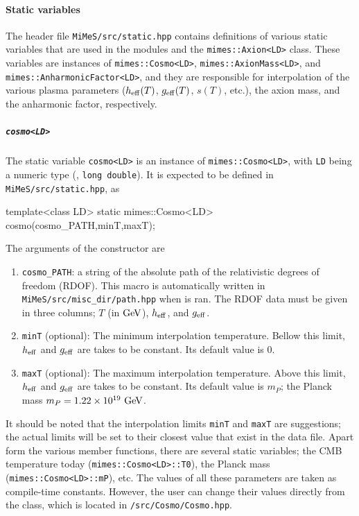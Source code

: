 \documentclass[11pt,a4paper]{article}
\begin{document}
\paragraph{Static variables} The header file {\tt MiMeS/src/static.hpp} contains definitions of various static variables that are used in the \PY modules and the {\tt mimes::Axion<LD>} class. These variables are instances of  {\tt mimes::Cosmo<LD>}, {\tt mimes::AxionMass<LD>}, and {\tt mimes::AnharmonicFactor<LD>}, and they are responsible for interpolation of the various plasma parameters (\ie $h_{\rm eff}{}(T)$, $g_{\rm eff}{}(T)$, $s(T)$, etc.), the axion mass, and the anharmonic factor, respectively.

\subparagraph{{\tt cosmo<LD>}} The static variable {\tt cosmo<LD>} is an instance of {\tt mimes::Cosmo<LD>}, with {\tt LD} being a numeric type (, {\tt long double}). It is expected to be defined in {\tt MiMeS/src/static.hpp}, as 
%
\begin{cpp}
	template<class LD> static mimes::Cosmo<LD> cosmo(cosmo_PATH,minT,maxT);
\end{cpp}
%
The arguments of the constructor are
%
\begin{enumerate}
	\item {\tt cosmo\_PATH}: a string of the absolute path of the relativistic degrees of freedom (RDOF). This macro is automatically
	written in {\tt MiMeS/src/misc\_dir/path.hpp} when  is ran. The RDOF data must be given in three columns; $T$ (in ${\rm GeV}$), $h_{\rm eff}{}$, and $g_{\rm eff}{}$.
	\item {\tt minT} (optional): The minimum interpolation temperature. Bellow this limit, $h_{\rm eff}{}$ and $g_{\rm eff}{}$ are takes to be constant. Its default value is $0$.
	\item {\tt maxT} (optional): The maximum interpolation temperature. Above this limit, $h_{\rm eff}{}$ and $g_{\rm eff}{}$ are takes to be constant. Its default value is $m_P$; the Planck mass $m_P = 1.22 \times 10^{19}~{\rm GeV}$.
\end{enumerate} 
%
It should be noted that  the interpolation limits {\tt minT} and {\tt maxT} are suggestions; the actual limits will be set to their closest value that exist in the data file. Apart form the various member functions, there are several static variables; \eg the CMB temperature today ({\tt mimes::Cosmo<LD>::T0}), the Planck mass ({\tt mimes::Cosmo<LD>::mP}), etc. The values of all these parameters are taken as compile-time constants. However, the user can change their values directly from the class, which is located in {\tt \mimes/src/Cosmo/Cosmo.hpp}.
\end{document}
